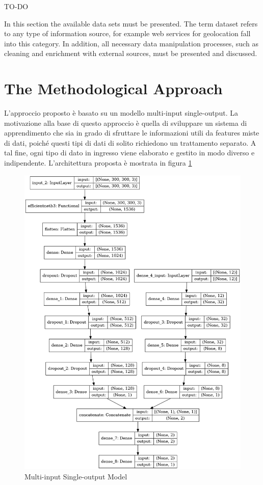     
    
    
    
    
    
    TO-DO

    In this section the available data sets must be presented. The term dataset refers to any type of information source, for example web services for geolocation fall into this category. 
    In addition, all necessary data manipulation processes, such as cleaning and enrichment with external sources, must be presented and discussed.

\section{The Methodological Approach}


    L'approccio proposto è basato su un modello multi-input single-output. La motivazione alla base di questo approccio è quella di sviluppare un sistema di apprendimento che sia in grado di sfruttare le informazioni utili da features miste di dati, poiché questi tipi di dati di solito richiedono un trattamento separato. A tal fine, ogni tipo di dato in ingresso viene elaborato e gestito in modo diverso e indipendente. L'architettura proposta è mostrata in figura \ref{fig:model}


    \begin{figure}[h!]
        \centering
        \includegraphics[scale=0.35]{Plot/Model-Plot.png}
        \caption{Multi-input Single-output Model}
        \label{fig:model}
    \end{figure}

